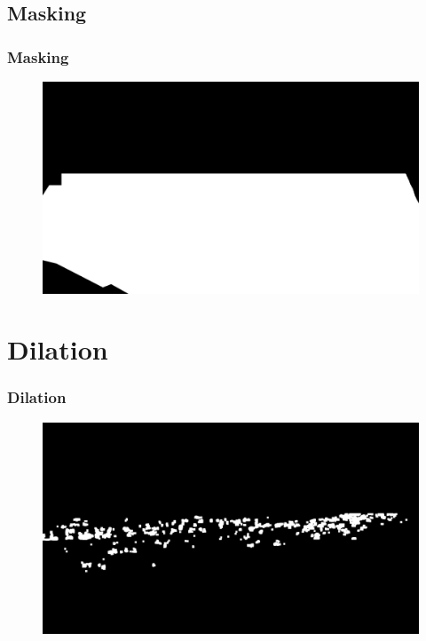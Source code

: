 \documentclass{beamer}
\begin{document}
\subsection*{Masking}
\begin{frame}
    \frametitle{Masking}
    \begin{figure}
        \centering
        \includegraphics[width=\textwidth]{../mask.png}
    \end{figure}
\end{frame}

\section*{Dilation}
\begin{frame}
    \frametitle{Dilation}

    \begin{figure}
        \centering
        \includegraphics[width=\textwidth]{../gen/dil/1660305600.jpg}
    \end{figure}

    
\end{frame}
\end{document}
